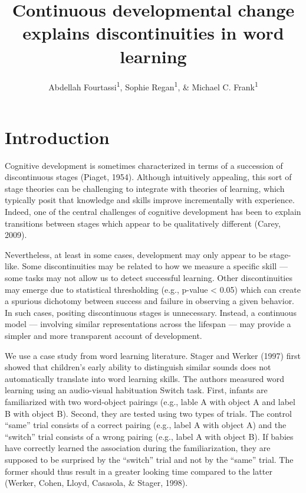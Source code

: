 \documentclass[english,,man,floatsintext]{apa6}
\title{Continuous developmental change explains discontinuities in word
learning}
\author{Abdellah Fourtassi\textsuperscript{1}, Sophie Regan\textsuperscript{1},
\& Michael C. Frank\textsuperscript{1}}
\date{}
\affiliation{
\vspace{0.5cm}
\textsuperscript{1} Department of Psychology, Stanford University}
\theoremstyle{definition}
\theoremstyle{definition}
\theoremstyle{definition}
\theoremstyle{remark}
\begin{document}
\maketitle

\section{Introduction}\label{introduction}

Cognitive development is sometimes characterized in terms of a
succession of discontinuous stages (Piaget, 1954). Although intuitively
appealing, this sort of stage theories can be challenging to integrate
with theories of learning, which typically posit that knowledge and
skills improve incrementally with experience. Indeed, one of the central
challenges of cognitive development has been to explain transitions
between stages which appear to be qualitatively different (Carey, 2009).

Nevertheless, at least in some cases, development may only appear to be
stage-like. Some discontinuities may be related to how we measure a
specific skill --- some tasks may not allow us to detect successful
learning. Other discontinuities may emerge due to statistical
thresholding (e.g., p-value \textless{} 0.05) which can create a
spurious dichotomy between success and failure in observing a given
behavior. In such cases, positing discontinuous stages is unnecessary.
Instead, a continuous model --- involving similar representations across
the lifespan --- may provide a simpler and more transparent account of
development.

We use a case study from word learning literature. Stager and Werker
(1997) first showed that children's early ability to distinguish similar
sounds does not automatically translate into word learning skills. The
authors measured word learning using an audio-visual habituation Switch
task. First, infants are familiarized with two word-object pairings
(e.g., lable A with object A and label B with object B). Second, they
are tested using two types of trials. The control \enquote{same} trial
consists of a correct pairing (e.g., label A with object A) and the
\enquote{switch} trial consists of a wrong pairing (e.g., label A with
object B). If babies have correctly learned the association during the
familiarization, they are supposed to be surprised by the
\enquote{switch} trial and not by the \enquote{same} trial. The former
should thus result in a greater looking time compared to the latter
(Werker, Cohen, Lloyd, Casasola, \& Stager, 1998).
\end{document}

